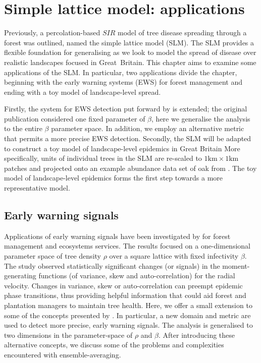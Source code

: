 
\chapter{Simple lattice model: applications}
\label{chapter:SLM-applications}

Previously, a percolation-based $SIR$ model of tree disease spreading through a forest was outlined, named the simple lattice model (SLM).
The SLM provides a flexible foundation for generalising as we look to model the spread of disease over realistic landscapes focused in Great Britain.
This chapter aims to examine some applications of the SLM.
In particular, two applications divide the chapter, beginning with the early warning systems (EWS) for forest management and ending with a toy model of landscape-level spread.

Firstly, the system for EWS detection put forward by \cite{OROZCOFUENTES201912} is extended; the original publication considered one fixed parameter of $\beta$, here we generalise the analysis to the entire $\beta$ parameter space. In addition, we employ an alternative metric that permits a more precise EWS detection.
Secondly, the SLM will be adapted to construct a toy model of landscape-level epidemics in Great Britain
More specifically, units of individual trees in the SLM are re-scaled to $\mathrm{1km \times 1km}$ patches 
and projected onto an example abundance data set of oak from \cite{hill.data}.
The toy model of landscape-level epidemics forms the first step towards a more representative model.

\section{Early warning signals}
\label{sec:EWS}

Applications of early warning signals have been investigated by \cite{OROZCOFUENTES201912} for forest management and ecosystems services.
The results focused on a one-dimensional parameter space of tree density $\rho$ over a square lattice with fixed infectivity $\beta$.
The study observed statistically significant changes (or signals) in the
moment-generating functions (of variance, skew and auto-correlation) for the radial velocity.
Changes in variance, skew or auto-correlation can preempt epidemic phase transitions, 
thus providing helpful information that could aid forest and plantation managers to maintain tree health. 
Here, we offer a small extension to some of the concepts presented by \cite{OROZCOFUENTES201912}.
In particular, a new domain and metric are used to detect more precise, early warning signals.  
The analysis is generalised to two dimensions in the parameter-space of $\rho$ and $\beta$. 
After introducing these alternative concepts, we discuss some of the problems and complexities encountered with ensemble-averaging. 

